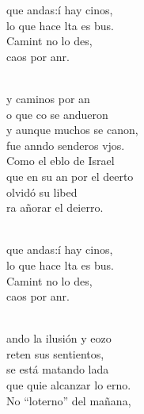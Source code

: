 \documentclass[12pt]{article}
\begin{document}
\begin{multicols*}{2}
\begin{cancion}%
	\begin{chorus}%
	 que andas:í hay cinos,  \\
	lo que hace lta es bus.\\
	Camint no lo des,\\
	 caos por anr.\\
	\end{chorus}%
	\jump\\
	y caminos por an \\
	o que co se andueron\\
	y aunque muchos se canon, \\
	fue anndo senderos vjos.\\
	Como el eblo de Israel \\
	que en su an por el deerto\\
	olvidó su libed \\
	ra añorar el deierro.\\\jump\\
	\begin{chorus}%
	 que andas:í hay cinos,  \\
	lo que hace lta es bus.\\
	Camint no lo des,\\
	 caos por anr.\\
	\end{chorus}%
	\jump\\
	ando la ilusión y eozo \\
	reten sus sentientos,\\
	se está matando lada\\
	que quie alcanzar lo erno.\\
	No “loterno” del mañana, \\

\end{cancion}
\end{multicols*}
\end{document}
